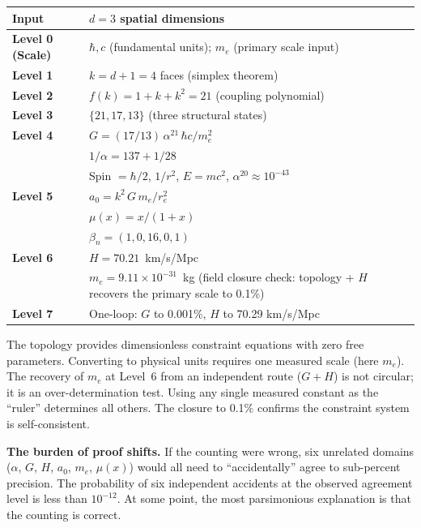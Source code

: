 \documentclass[aps,prd,preprint,superscriptaddress,showpacs,preprintnumbers,amsmath,amssymb,nofootinbib]{revtex4-2}
\begin{document}
\begin{center}
\renewcommand{\arraystretch}{1.3}
\begin{tabular}{@{}ll@{}}
\textbf{Input} & $d = 3$ spatial dimensions \\
\midrule
\textbf{Level 0 (Scale)} & $\hbar, c$ (fundamental units); $m_e$ (primary scale input) \\
\textbf{Level 1} & $k = d + 1 = 4$ faces (simplex theorem) \\
\textbf{Level 2} & $f(k) = 1 + k + k^2 = 21$ (coupling polynomial) \\
\textbf{Level 3} & $\{21, 17, 13\}$ (three structural states) \\
\textbf{Level 4} & $G = (17/13)\,\alpha^{21}\,\hbar c/m_e^2$ \\
 & $1/\alpha = 137 + 1/28$ \\
 & Spin $= \hbar/2$, $1/r^2$, $E = mc^2$, $\alpha^{20} \approx 10^{-43}$ \\
\textbf{Level 5} & $a_0 = k^2\,G\,m_e/r_e^2$ \\
 & $\mu(x) = x/(1+x)$ \\
 & $\beta_n = (1, 0, 16, 0, 1)$ \\
\textbf{Level 6} & $H = 70.21$~km/s/Mpc \\
 & $m_e = 9.11 \times 10^{-31}$~kg (field closure check: topology + $H$ recovers the primary scale to 0.1\%) \\
\textbf{Level 7} & One-loop: $G$ to 0.001\%, $H$ to 70.29 km/s/Mpc \\
\end{tabular}
\end{center}

\noindent The topology provides dimensionless constraint equations with zero free parameters. Converting to physical units requires one measured scale (here $m_e$). The recovery of $m_e$ at Level~6 from an independent route ($G + H$) is not circular; it is an over-determination test. Using any single measured constant as the ``ruler'' determines all others. The closure to 0.1\% confirms the constraint system is self-consistent.

\textbf{The burden of proof shifts.} If the counting were wrong, six unrelated domains ($\alpha$, $G$, $H$, $a_0$, $m_e$, $\mu(x)$) would all need to ``accidentally'' agree to sub-percent precision. The probability of six independent accidents at the observed agreement level is less than $10^{-12}$. At some point, the most parsimonious explanation is that the counting is correct.
\end{document}

